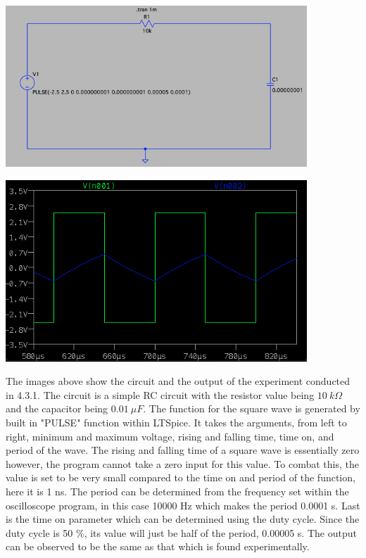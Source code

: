 \documentclass[12pt]{article}
\newcommand{\objects}[2]{%
  \leavevmode\vbox{\hbox{#1}\nointerlineskip\hbox{#2}}%
}
\begin{document}
    \newpage
    \begin{center}
        \objects
            {\includegraphics[width=0.85\textwidth]{4.3.1 LTSpice Circuit.png}}
            \:
            {\includegraphics[width=0.85\textwidth]{4.3.1 LTSpice Output.png}}
    \end{center}
    \par The images above show the circuit and the output of the experiment conducted in 4.3.1. The circuit is a simple RC circuit with the resistor value being $ 10\ k\Omega $ and the capacitor being $ 0.01\ \mu F $. The function for the square wave is generated by built in "PULSE" function within LTSpice. It takes the arguments, from left to right, minimum and maximum voltage, rising and falling time, time on, and period of the wave. The rising and falling time of a square wave is essentially zero however, the program cannot take a zero input for this value. To combat this, the value is set to be very small compared to the time on and period of the function, here it is 1 ns. The period can be determined from the frequency set within the oscilloscope program, in this case 10000 Hz which makes the period 0.0001 s. Last is the time on parameter which can be determined using the duty cycle. Since the duty cycle is 50 \%, its value will just be half of the period, 0.00005 s. The output can be observed to be the same as that which is found experimentally.
\end{document}
